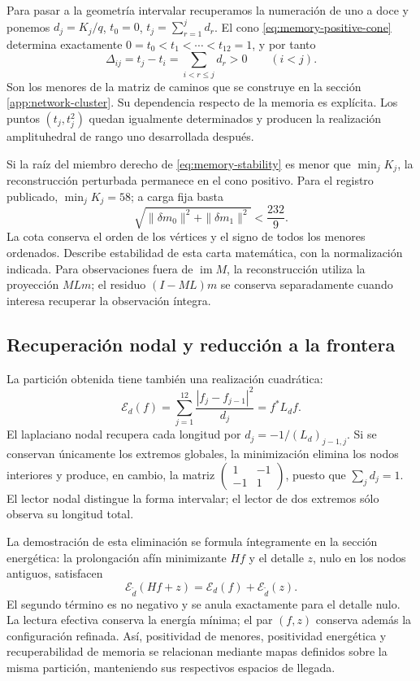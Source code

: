 \documentclass[a4paper,10pt]{article}
\theoremstyle{definition}\newtheorem{definition}[theorem]{Definición}
\theoremstyle{remark}\newtheorem{remark}[theorem]{Observación}
\numberwithin{equation}{section}
\begin{document}
Para pasar a la geometría intervalar recuperamos la numeración de uno a doce
y ponemos \(d_j=K_j/q\), \(t_0=0\),
\(t_j=\sum_{r=1}^j d_r\). El cono \eqref{eq:memory-positive-cone}
determina exactamente \(0=t_0<t_1<\cdots<t_{12}=1\), y por tanto
\[
 \Delta_{ij}=t_j-t_i=\sum_{i<r\leq j}d_r>0\qquad(i<j).
\]
Son los menores de la matriz de caminos que se construye en la sección
\ref{app:network-cluster}. Su dependencia respecto de la memoria es
explícita. Los puntos \((t_j,t_j^2)\) quedan igualmente determinados y
producen la realización amplituhedral de rango uno desarrollada después.

Si la raíz del miembro derecho de \eqref{eq:memory-stability} es menor que
\(\min_j K_j\), la reconstrucción perturbada permanece en el cono positivo.
Para el registro publicado, \(\min_jK_j=58\); a carga fija basta
\[
 \sqrt{\|\delta m_0\|^2+\|\delta m_1\|^2}<\frac{232}{9}.
\]
La cota conserva el orden de los vértices y el signo de todos los menores
ordenados. Describe estabilidad de esta carta matemática, con la
normalización indicada. Para observaciones fuera de \(\operatorname{im}M\),
la reconstrucción utiliza la proyección \(MLm\); el residuo
\((I-ML)m\) se conserva separadamente cuando interesa recuperar la
observación íntegra.

\subsection{Recuperación nodal y reducción a la frontera}

La partición obtenida tiene también una realización cuadrática:
\[
 \mathcal E_d(f)=\sum_{j=1}^{12}\frac{|f_j-f_{j-1}|^2}{d_j}
 =f^*L_df.
\]
El laplaciano nodal recupera cada longitud por
\(d_j=-1/(L_d)_{j-1,j}\). Si se conservan únicamente los extremos
globales, la minimización elimina los nodos interiores y produce, en
cambio, la matriz \(\left(\begin{smallmatrix}1&-1\\-1&1\end{smallmatrix}\right)\),
puesto que \(\sum_jd_j=1\). El lector nodal distingue la forma intervalar;
el lector de dos extremos sólo observa su longitud total.

La demostración de esta eliminación se formula íntegramente en la sección
energética: la prolongación afín minimizante \(Hf\) y el detalle \(z\),
nulo en los nodos antiguos, satisfacen
\[
 \mathcal E_{\widetilde d}(Hf+z)
 =\mathcal E_d(f)+\mathcal E_{\widetilde d}(z).
\]
El segundo término es no negativo y se anula exactamente para el detalle
nulo. La lectura efectiva conserva la energía mínima; el par \((f,z)\)
conserva además la configuración refinada. Así, positividad de menores,
positividad energética y recuperabilidad de memoria se relacionan mediante
mapas definidos sobre la misma partición, manteniendo sus respectivos
espacios de llegada.
\end{document}

